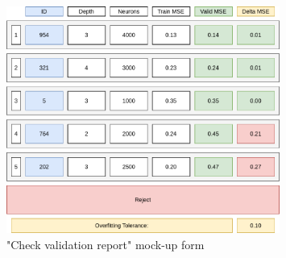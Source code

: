 \begin{figure}[H]
\centering
\includegraphics[width=0.8\textwidth]{figures/check_validation_report.pdf}
\caption{"Check validation report" mock-up form}
\end{figure}

